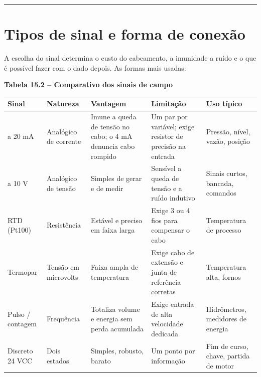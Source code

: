 \begin{center}\rule{0.5\linewidth}{0.5pt}\end{center}

\section{Tipos de sinal e forma de conexão}\label{tipos-de-sinal-e-forma-de-conexuxe3o}

A escolha do sinal determina o custo do cabeamento, a imunidade a ruído e o que é possível fazer com
o dado depois. As formas mais usadas:

\textbf{Tabela 15.2 -- Comparativo dos sinais de campo}

\begin{longtable}[]{@{}
  >{\raggedright\arraybackslash}p{}
  >{\raggedright\arraybackslash}p{}
  >{\raggedright\arraybackslash}p{}
  >{\raggedright\arraybackslash}p{}
  >{\raggedright\arraybackslash}p{}@{}}
\toprule\noalign{}
\begin{minipage}[b]{\linewidth}\raggedright
Sinal
\end{minipage} & \begin{minipage}[b]{\linewidth}\raggedright
Natureza
\end{minipage} & \begin{minipage}[b]{\linewidth}\raggedright
Vantagem
\end{minipage} & \begin{minipage}[b]{\linewidth}\raggedright
Limitação
\end{minipage} & \begin{minipage}[b]{\linewidth}\raggedright
Uso típico
\end{minipage} \\
\midrule\noalign{}
\endhead
\bottomrule\noalign{}
\endlastfoot
4 a 20 mA & Analógico de corrente & Imune a queda de tensão no cabo; o 4 mA denuncia cabo rompido & Um par por variável; exige resistor de precisão na entrada & Pressão, nível, vazão, posição \\
0 a 10 V & Analógico de tensão & Simples de gerar e de medir & Sensível a queda de tensão e a ruído indutivo & Sinais curtos, bancada, comandos \\
RTD (Pt100) & Resistência & Estável e preciso em faixa larga & Exige 3 ou 4 fios para compensar o cabo & Temperatura de processo \\
Termopar & Tensão em microvolts & Faixa ampla de temperatura & Exige cabo de extensão e junta de referência corretas & Temperatura alta, fornos \\
Pulso / contagem & Frequência & Totaliza volume e energia sem perda acumulada & Exige entrada de alta velocidade dedicada & Hidrômetros, medidores de energia \\
Discreto 24 VCC & Dois estados & Simples, robusto, barato & Um ponto por informação & Fim de curso, chave, partida de motor \\
\end{longtable}

